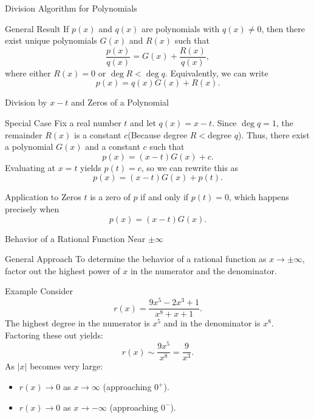 \documentclass{beamer}
\begin{document}
\begin{frame}{Division Algorithm for Polynomials}
  \begin{block}{General Result}
    If \(p(x)\) and \(q(x)\) are polynomials with \(q(x) \neq 0\), then there exist unique polynomials \(G(x)\) and \(R(x)\) such that
    \[
      \frac{p(x)}{q(x)} = G(x) + \frac{R(x)}{q(x)},
    \]
    where either \(R(x)=0\) or \(\deg R < \deg q\). Equivalently, we can write
    \[
      p(x)=q(x)G(x)+R(x).
    \]
  \end{block}
\end{frame}


\begin{frame}{Division by \(x-t\) and Zeros of a Polynomial}
  \begin{block}{Special Case}
    Fix a real number \(t\) and let \(q(x)=x-t\). Since \(\deg q=1\), the remainder \(R(x)\) is a constant \(c\)(Because degree \(R < \)degree \(q\)). Thus, there exist a polynomial \(G(x)\) and a constant \(c\) such that
    \[
      p(x) = (x-t)G(x) + c.
    \]
    Evaluating at \(x=t\) yields \(p(t)=c\), so we can rewrite this as
    \[
      p(x) = (x-t)G(x) + p(t).
    \]
  \end{block}
  \vspace{0.5em}
  \begin{block}{Application to Zeros}
    \(t\) is a zero of \(p\) if and only if \(p(t)=0\), which happens precisely when
    \[
      p(x)=(x-t)G(x).
    \]
  \end{block}
\end{frame}

\begin{frame}{Behavior of a Rational Function Near \(\pm\infty\)}
  \begin{block}{General Approach}
    To determine the behavior of a rational function as \(x\to\pm\infty\), factor out the highest power of \(x\) in the numerator and the denominator.
  \end{block}
\end{frame} 
\begin{frame}
  \begin{block}{Example}
    Consider 
    \[
      r(x)=\frac{9x^5-2x^3+1}{x^8+x+1}.
    \]
    The highest degree in the numerator is \(x^5\) and in the denominator is \(x^8\). Factoring these out yields:
    \[
      r(x) \sim \frac{9x^5}{x^8}=\frac{9}{x^3}.
    \]
    As \(|x|\) becomes very large:
    \begin{itemize}
      \item \(r(x)\to 0\) as \(x\to\infty\) (approaching \(0^+\)).
      \item \(r(x)\to 0\) as \(x\to-\infty\) (approaching \(0^-\)).
    \end{itemize}
  \end{block}
\end{frame}
\end{document}
